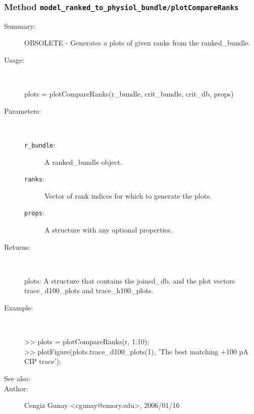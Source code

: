 \subsubsection[Method \texttt{plotCompareRanks}]{Method \texttt{model\_ranked\_to\_physiol\_bundle/plotCompareRanks}}%
%
\label{ref_model_ranked_to_physiol_bundle__plotCompareRanks}%
\hypertarget{ref_model_ranked_to_physiol_bundle__plotCompareRanks}{}%
\begin{description}
\item[Summary:]OBSOLETE - Generates a plots of given ranks from the ranked\_bundle.
%
\item[Usage:]~%
\begin{lyxcode}%
plots = plotCompareRanks(r\_bundle, crit\_bundle, crit\_db, props)
%
\end{lyxcode}%
%
%
\item[Parameters:]~
\begin{description}%
\item[\texttt{r\_bundle}:]
 A ranked\_bundle object.
\item[\texttt{ranks}:]
 Vector of rank indices for which to generate the plots.
\item[\texttt{props}:]
 A structure with any optional properties.
\end{description}%
%
\item[Returns:]~

	plots: A structure that contains the joined\_db, and the plot vectors 
	  trace\_d100\_plots and trace\_h100\_plots.
%
\item[Example:]~
\begin{lyxcode} >> plots = plotCompareRanks(r, 1:10);\\%
 >> plotFigure(plots.trace\_d100\_plots(1), 'The best matching +100 pA CIP trace');\\%
\end{lyxcode}
%
\item[See also:]%
%
\item[Author:]%
Cengiz Gunay <cgunay@emory.edu>, 2006/01/16%
\end{description}
\methodline%
